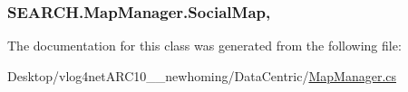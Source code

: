\hypertarget{class_s_e_a_r_c_h_1_1_map_manager_a7d1956765c5b914c90b9b957c1b49717}{
\subsubsection[{Social\-Map}]{ S\-E\-A\-R\-C\-H.\-Map\-Manager.\-Social\-Map\hspace{0.3cm}{\ttfamily [get]}, {\ttfamily [set]}}}\label{class_s_e_a_r_c_h_1_1_map_manager_a7d1956765c5b914c90b9b957c1b49717}


The documentation for this class was generated from the following file\-:\begin{DoxyCompactItemize}
\item 
Desktop/vlog4net\-A\-R\-C10\-\_\-\_\-newhoming/\-Data\-Centric/\hyperlink{_map_manager_8cs}{Map\-Manager.\-cs}\end{DoxyCompactItemize}
